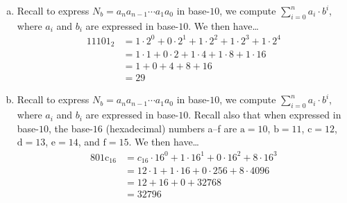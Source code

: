 \documentclass[11pt,letterpaper]{article}
\begin{document}
\begin{enumerate}[(a)]
\item Recall to express $N_b= a_n a_{n-1} \cdots a_1 a_0$ in base-$10$, we compute $\sum_{i=0}^n a_i \cdot b^i$, where $a_i$ and $b_i$ are expressed in base-$10$. We then have\dots 
	\[
	\begin{aligned}
	11101_2&= 1 \cdot 2^0 + 0 \cdot 2^1 + 1 \cdot 2^2 + 1 \cdot 2^3 + 1 \cdot 2^4 \\[0.3cm]
	&= 1 \cdot 1 + 0 \cdot 2 + 1 \cdot 4 + 1 \cdot 8 + 1 \cdot 16 \\[0.3cm]
	&= 1 + 0 + 4 + 8 + 16 \\[0.3cm]
	&= 29
	\end{aligned} 
	\] \pspace

\item Recall to express $N_b= a_n a_{n-1} \cdots a_1 a_0$ in base-$10$, we compute $\sum_{i=0}^n a_i \cdot b^i$, where $a_i$ and $b_i$ are expressed in base-$10$. Recall also that when expressed in base-$10$, the base-$16$ (hexadecimal) numbers a--f are $\text{a}= 10$, $\text{b}= 11$, $\text{c}= 12$, $\text{d}= 13$, $\text{e}= 14$, and $\text{f}= 15$. We then have\dots 
	\[
	\begin{aligned}
	801\text{c}_{16}&= c_{16} \cdot 16^0 + 1 \cdot 16^1 + 0 \cdot 16^2 + 8 \cdot 16^3 \\[0.3cm]
	&= 12 \cdot 1 + 1 \cdot 16 + 0 \cdot 256 + 8 \cdot 4096 \\[0.3cm]
	&= 12 + 16 + 0 + 32768 \\[0.3cm]
	&= 32796
	\end{aligned} 
	\]  
\end{enumerate}
\end{document}
